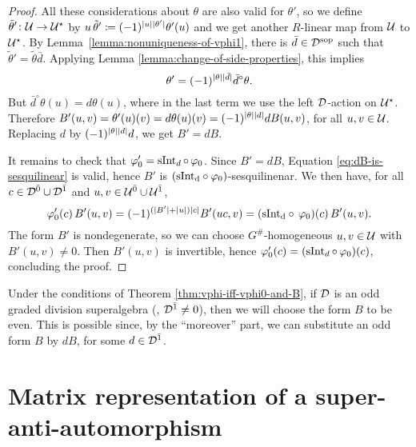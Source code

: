 \begin{proof}
    All these considerations about $\theta$ are also valid for $\theta'$, so we define $\tilde\theta'\colon \mathcal U \to \mathcal U^\star$ by $u\,\tilde\theta' \coloneqq (-1)^{|u||\theta'|} \theta'(u)$ and we get another $R$-linear map from $\mathcal U$ to $\mathcal U^\star$.
    By Lemma~\ref{lemma:nonuniqueness-of-vphi1}, there is $\bar d\in \mathcal{D}^{\mathrm{sop}}$ such that $\tilde\theta' = \tilde\theta \bar d$.
    Applying Lemma \ref{lemma:change-of-side-properties}, this implies \[\theta' = (-1)^{|\theta||\bar d|} \bar d^\circ \theta.\]
    But $\bar d^\circ \theta (u) = d\theta(u)$, where in the last term we use the left $\mathcal{D}$-action on $\mathcal U^\star$. 
    Therefore $B'(u,v) = \theta'(u)(v) = d\theta(u)(v) = (-1)^{|\theta||d|} dB(u, v)$, for all $u,v \in \mathcal U$. 
    Replacing $d$ by $(-1)^{|\theta||d|} d$, we get $B' = dB$. 
    
    It remains to check that $\varphi_0' = \operatorname{sInt}_d \circ\, \varphi_0$. 
    Since $B' = dB$, Equation \eqref{eq:dB-is-sesquilinear} is valid, hence $B'$ is $(\operatorname{sInt_d \circ \varphi_0})$-sesquilinenar.
    We then have, for all $c\in \mathcal{D}^{\bar0} \cup \mathcal{D}^{\bar1}$ and $u,v \in \mathcal U^{\bar0} \cup \mathcal U^{\bar1}$,
    \[
        \varphi_0'(c)\, B'(u,v) = (-1)^{(|B'| + |u|) |c|} B'(uc,v) = (\operatorname{sInt_d \circ\, \varphi_0}) (c)\, B'(u,v).
    \]
    The form $B'$ is nondegenerate, so we can choose $G^\#$-homogeneous $u,v\in \mathcal U$ with $B'(u,v)\neq 0$. Then $B'(u,v)$ is invertible, hence $\varphi_0' (c) = (\operatorname{sInt}_d \circ\, \varphi_0) (c)$, concluding the proof.
\end{proof}

\begin{convention}\label{conv:pick-even-form}
    Under the conditions of Theorem \ref{thm:vphi-iff-vphi0-and-B}, if $\mathcal{D}$ is an odd graded division superalgebra (\ie, $\mathcal{D}^{\bar1} \neq 0$), then we will choose the form $B$ to be even. 
    This is possible since, by the ``moreover'' part, we can substitute an odd form $B$ by $dB$, for some $d\in \mathcal{D}^{\bar1}$.
\end{convention}

\begin{cor}
        
\end{cor}

\section{Matrix representation of a su\-per\--anti\--auto\-mor\-phism}

